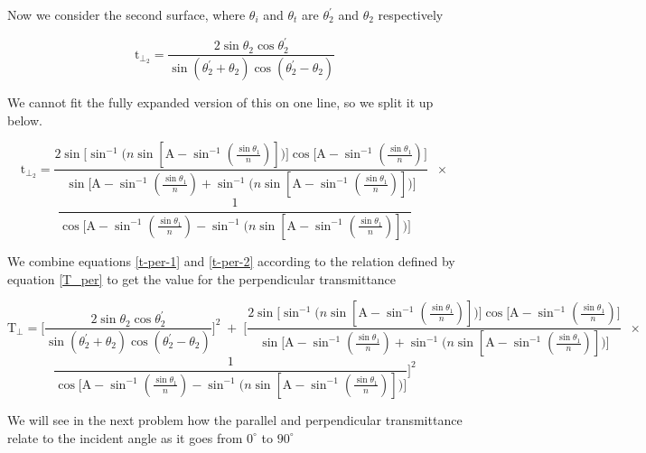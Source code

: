 Now we consider the second surface, where $\theta_i$ and $\theta_t$ are $\theta^{'}_2$ and $\theta_2$ respectively

\begin{equation} \label{t-per-2}
	\mathrm{t}_{\bot_2} = 
	\dfrac
	{
		2\sin\theta_2\cos\theta^{'}_2
	}
	{
		\sin(\theta^{'}_2 + \theta_2)\cos(\theta^{'}_2 - \theta_2)
	}
\end{equation}

We cannot fit the fully expanded version of this on one line, so we split it up below.

$$
	\mathrm{t}_{\bot_2} = 
	\dfrac
	{
		2\sin
		\big[ 
			\sin^{-1}
			\big(
				n
				\sin
				\left[
					\mathrm{A} - \sin^{-1}\left(\frac{\sin\theta_1}{n}\right) 
				\right]
			\big)
		\big]
		\cos
		\big[ 
			\mathrm{A} - \sin^{-1}\left(\frac{\sin\theta_1}{n}\right)
		\big]
	}
	{
		\sin
		\Big[ 
			\mathrm{A} - \sin^{-1}\left(\frac{\sin\theta_1}{n}\right)
			+ 
			\sin^{-1}\big(n\sin\left[ \mathrm{A} - \sin^{-1}\left(\frac{\sin\theta_1}{n}\right) \right]\big)
		\Big]
	}
	\;\;
	\times
$$
$$
	\dfrac
	{
		1
	}
	{
		\cos
		\Big[
			\mathrm{A} - \sin^{-1}\left(\frac{\sin\theta_1}{n}\right)
			- 
			\sin^{-1}\big(n\sin\left[ \mathrm{A} - \sin^{-1}\left(\frac{\sin\theta_1}{n}\right) \right]\big)
		\Big]
	}
$$

We combine equations \ref{t-per-1} and \ref{t-per-2} according to the relation defined by equation \ref{T_per} to get the value for the perpendicular
transmittance

$$
	\mathrm{T}_\bot = 
	\Bigg[
	\dfrac
	{
		2\sin\theta_2\cos\theta^{'}_2
	}
	{
		\sin(\theta^{'}_2 + \theta_2)\cos(\theta^{'}_2 - \theta_2)
	}
	\Bigg]^2
	\;
	+
	\;
	\Bigg[
	\dfrac
	{
		2\sin
		\big[ 
			\sin^{-1}\big(n\sin\left[ \mathrm{A} - \sin^{-1}\left(\frac{\sin\theta_1}{n}\right) \right]\big)
		\big]
		\cos
		\big[ 
			\mathrm{A} - \sin^{-1}\left(\frac{\sin\theta_1}{n}\right)
		\big]
	}
	{
		\sin
		\Big[ 
			\mathrm{A} - \sin^{-1}\left(\frac{\sin\theta_1}{n}\right)
			+ 
			\sin^{-1}\big(n\sin\left[ \mathrm{A} - \sin^{-1}\left(\frac{\sin\theta_1}{n}\right) \right]\big)
		\Big]
	}
	\;\;
	\times
$$
$$
	\dfrac
	{
		1
	}
	{
		\cos
		\Big[
			\mathrm{A} - \sin^{-1}\left(\frac{\sin\theta_1}{n}\right)
			- 
			\sin^{-1}\big(n\sin\left[ \mathrm{A} - \sin^{-1}\left(\frac{\sin\theta_1}{n}\right) \right]\big)
		\Big]
	}
	\Bigg]^2
$$

We will see in the next problem how the parallel and perpendicular transmittance relate to the incident angle as it goes from $0^\circ$ to $90^\circ$